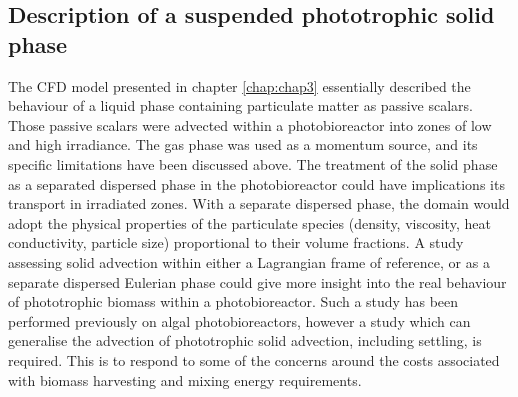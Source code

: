 \subsection{Description of a suspended phototrophic solid phase}
The CFD model presented in chapter \ref{chap:chap3} essentially described the behaviour of a liquid phase containing particulate matter as passive scalars. Those passive scalars were advected within a photobioreactor into zones of low and high irradiance. The gas phase was used as a momentum source, and its specific limitations have been discussed above. The treatment of the solid phase as a separated dispersed phase in the photobioreactor could have implications its transport in irradiated zones. With a separate dispersed phase, the domain would adopt the physical properties of the particulate species (density, viscosity, heat conductivity, particle size) proportional to their volume fractions. A study assessing solid advection within either a Lagrangian frame of reference, or as a separate dispersed Eulerian phase could give more insight into the real behaviour of phototrophic biomass within a photobioreactor. Such a study has been performed previously \cite{gao2016} on algal photobioreactors, however a study which can generalise the advection of phototrophic solid advection, including settling, is required. This is to respond to some of the concerns around the costs associated with biomass harvesting and mixing energy requirements. 


